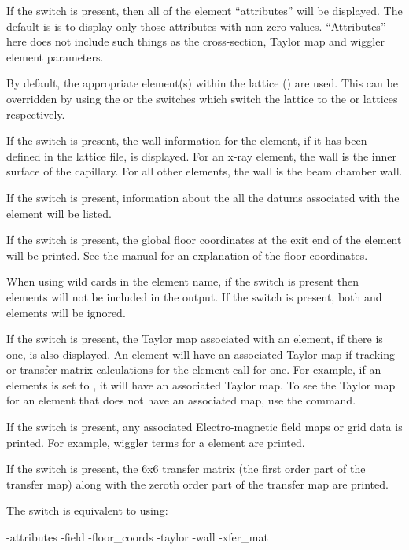 {{{{{If the  switch is present, then all of the element ``attributes'' will be
displayed. The default is is to display only those attributes with non-zero
values. ``Attributes'' here does not include such things as the cross-section, Taylor map
and wiggler element parameters.

By default, the appropriate element(s) within the  lattice ()
are used. This can be overridden by using the  or the  switches
which switch the lattice to the  or  lattices respectively.

If the  switch is present, the wall information for the element, if it has been
defined in the lattice file, is displayed. For an x-ray  element, the wall
is the inner surface of the capillary. For all other elements, the wall is the beam
chamber wall.

If the  switch is present, information about the all the datums associated with
the element will be listed.

If the  switch is present, the global floor coordinates at the exit end
of the element will be printed. See the \bmad manual for an explanation of the floor
coordinates.

When using wild cards in the element name, if the  switch is present then
 elements will not be included in the output. If the  switch is
present, both  and  elements will be ignored.

If the  switch is present, the Taylor map associated with an element, if there
is one, is also displayed. An element will have an associated Taylor map if tracking or
transfer matrix calculations for the element call for one. For example, if an elements
 is set to , it will have an associated Taylor map. To see
the Taylor map for an element that does not have an associated map, use the  command.

If the  switch is present, any associated Electro-magnetic field maps or grid
data is printed. For example, wiggler terms for a   element are
printed.

If the  switch is present, the 6x6 transfer matrix (the first order part of
the transfer map) along with the zeroth order part of the transfer map are printed.

The  switch is equivalent to using:
\begin{example}
  -attributes
  -field
  -floor_coords
  -taylor
  -wall
  -xfer_mat
\end{example}

}}}}}
